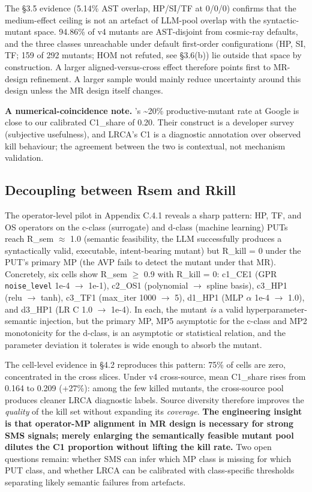 \documentclass[acmsmall,screen,review]{acmart}
\begin{document}
The §3.5 evidence (5.14\% AST overlap, HP/SI/TF at 0/0/0) confirms that
the medium-effect ceiling is not an artefact of LLM-pool overlap with
the syntactic-mutant space. 94.86\% of v4 mutants are AST-disjoint from
cosmic-ray defaults, and the three classes unreachable under default
first-order configurations (HP, SI, TF; 159 of 292 mutants; HOM not
refuted, see §3.6(b)) lie outside that space by construction. A
larger aligned-versus-cross effect therefore points first to MR-design
refinement. A larger sample would mainly reduce uncertainty around this
design unless the MR design itself changes.

\textbf{A numerical-coincidence note.} \citeauthor{1929c365d171c78c9c24b242b5b57e2832bc907b}'s \citeyearpar{1929c365d171c78c9c24b242b5b57e2832bc907b}
\textasciitilde20\% productive-mutant rate at Google is close to our
calibrated C1\_share of 0.20. Their construct is a developer survey
(subjective usefulness), and LRCA's C1 is a diagnostic annotation over
observed kill behaviour; the agreement between the two is contextual,
not mechanism validation.

\subsection{Decoupling between Rsem and Rkill}\label{decoupling-between-r_sem-and-r_kill}

The operator-level pilot in Appendix C.4.1 reveals a sharp pattern: HP,
TF, and OS operators on the c-class (surrogate) and d-class (machine
learning) PUTs reach R\_sem $\approx$ 1.0 (semantic feasibility, the LLM
successfully produces a syntactically valid, executable, intent-bearing
mutant) but R\_kill = 0 under the PUT's primary MP (the AVP fails to
detect the mutant under that MR). Concretely, six cells show R\_sem $\geq$
0.9 with R\_kill = 0: c1\_CE1 (GPR \texttt{noise\_level} 1e-4 $\to$ 1e-1),
c2\_OS1 (polynomial $\to$ spline basis), c3\_HP1 (relu $\to$ tanh), c3\_TF1
(max\_iter 1000 $\to$ 5), d1\_HP1 (MLP $\alpha$ 1e-4 $\to$ 1.0), and d3\_HP1 (LR C 1.0
$\to$ 1e-4). In each, the mutant \emph{is} a valid hyperparameter-semantic
injection, but the primary MP, MP5 asymptotic for the c-class and MP2
monotonicity for the d-class, is an asymptotic or statistical relation,
and the parameter deviation it tolerates is wide enough to absorb the
mutant.

The cell-level evidence in §4.2 reproduces this pattern: 75\% of cells
are zero, concentrated in the cross slices. Under v4 cross-source, mean
C1\_share rises from 0.164 to 0.209 (+27\%): among the few killed
mutants, the cross-source pool produces cleaner LRCA diagnostic labels.
Source diversity therefore improves the \emph{quality} of the kill set
without expanding its \emph{coverage}. \textbf{The engineering insight is that
operator-MP alignment in MR design is necessary for strong SMS signals;
merely enlarging the semantically feasible mutant pool dilutes the C1
proportion without lifting the kill rate.} Two open questions remain:
whether SMS can infer which MP class is missing for which PUT class, and
whether LRCA can be calibrated with class-specific thresholds separating
likely semantic failures from artefacts.
\end{document}

